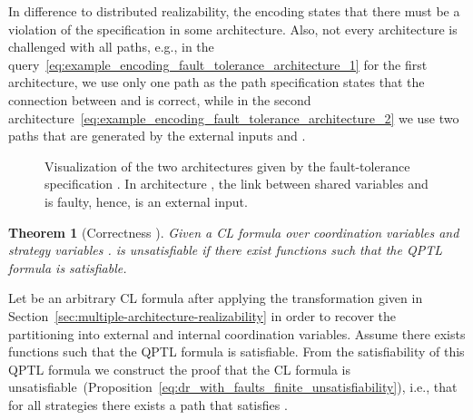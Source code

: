 \documentclass{LMCS}
\theoremstyle{plain}\newtheorem{theorem}[thm]{Theorem}
\theoremstyle{plain}\newtheorem{lemma}[thm]{Lemma}
\theoremstyle{plain}\newtheorem{proposition}[thm]{Proposition}
\theoremstyle{plain}\newtheorem{corollary}[thm]{Corollary}
\theoremstyle{definition}\newtheorem{definition}{Definition}[section]
\begin{document}
In difference to distributed realizability, the encoding states that there must be a violation of the specification in some architecture.
Also, not every architecture is challenged with all paths, e.g., in the query~\eqref{eq:example_encoding_fault_tolerance_architecture_1} for the first architecture, we use only one path as the path specification states that the connection between  and  is correct, while in the second architecture~\eqref{eq:example_encoding_fault_tolerance_architecture_2} we use two paths that are generated by the external inputs  and .
\begin{figure}[t]
  \centering
  \qquad {}   \caption[]{Visualization of the two architectures given by the fault-tolerance specification . In architecture , the link between shared variables  and  is faulty, hence,  is an external input.}
  \label{fig:fault_cyclic_architecture}
\end{figure}

\begin{theorem}[Correctness ] \label{thm:correctness_unsatnf}
  Given a CL formula  over coordination variables  and strategy variables .
   is unsatisfiable if there exist functions  such that the QPTL formula  is satisfiable.
\end{theorem}
\proof
  Let  be an arbitrary CL formula after applying the transformation  given in Section~\ref{sec:multiple-architecture-realizability} in order to recover the partitioning into external and internal coordination variables.
  Assume there exists functions  such that the QPTL formula  is satisfiable.
  From the satisfiability of this QPTL formula we construct the proof that the CL formula  is unsatisfiable~(Proposition~\ref{eq:dr_with_faults_finite_unsatisfiability}), i.e., that for all strategies there exists a path  that satisfies .
  
\end{document}
